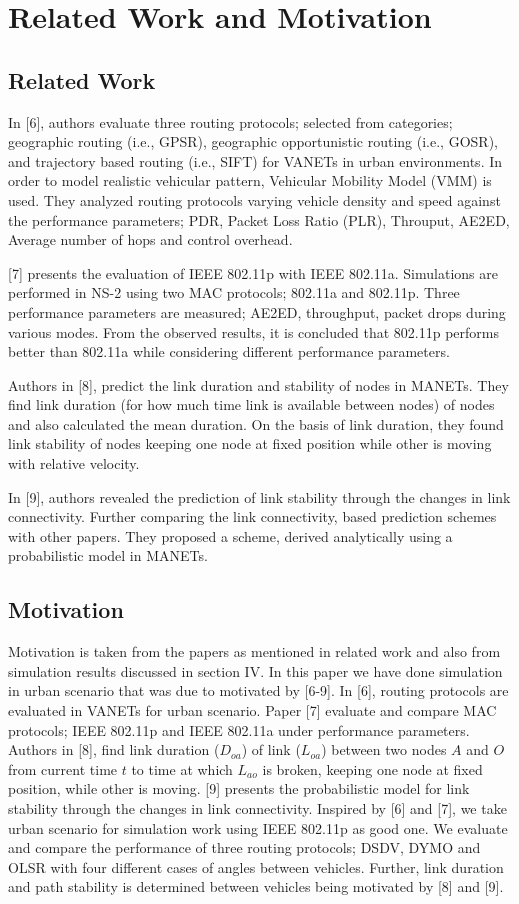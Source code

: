 \documentclass[journal]{IEEEtran}
\begin{document}
\section{Related Work and Motivation}

\subsection{Related Work}
In [6], authors evaluate three routing protocols; selected from categories; geographic routing (i.e., GPSR), geographic opportunistic routing (i.e., GOSR), and trajectory based routing (i.e., SIFT) for VANETs in urban environments. In order to model realistic vehicular pattern, Vehicular Mobility Model (VMM) is used. They analyzed routing protocols varying vehicle density and speed against the performance parameters; PDR,  Packet Loss Ratio (PLR), Throuput, AE2ED, Average number of hops and control overhead.

[7] presents the evaluation of IEEE 802.11p with IEEE 802.11a. Simulations are performed in NS-2 using two MAC protocols; 802.11a and 802.11p. Three performance parameters are measured; AE2ED, throughput, packet drops during various modes. From the observed results, it is concluded that 802.11p performs better than 802.11a while considering different performance parameters.

Authors in [8], predict the link duration and stability of nodes in MANETs. They find link duration (for how much time link is available between nodes) of nodes and also calculated the mean duration. On the basis of link duration, they found link stability of nodes keeping one node at fixed position while other is moving with relative velocity.

In [9], authors revealed the prediction of link stability through the changes in link connectivity. Further comparing the link connectivity, based prediction schemes with other papers. They proposed a scheme, derived analytically using a probabilistic model in MANETs.

\subsection{Motivation}
Motivation is taken from the papers as mentioned in related work and also from simulation results discussed in section IV. In this paper we have done simulation in urban scenario that was due to motivated by [6-9]. In [6], routing protocols are evaluated in VANETs for urban scenario. Paper [7] evaluate and compare MAC protocols; IEEE 802.11p and IEEE 802.11a under performance parameters. Authors in [8], find link duration ($D_{oa}$) of link ($L_{oa}$) between two nodes $A$ and $O$ from current time $t$ to time at which $L_{ao}$ is broken, keeping one node at fixed position, while other is moving. [9] presents the probabilistic model for link stability through the changes in link connectivity. Inspired by [6] and [7], we take urban scenario for simulation work using IEEE 802.11p as good one. We evaluate and compare the performance of three routing protocols; DSDV, DYMO and OLSR with four different cases of angles between vehicles. Further, link duration and path stability is determined between vehicles being motivated by [8] and [9].
\end{document}
